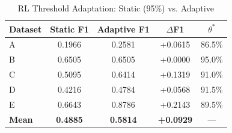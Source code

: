\begin{table}[htbp]
\caption{RL Threshold Adaptation: Static (95\%) vs. Adaptive}
\begin{center}
\begin{tabular}{|l|c|c|c|c|}
\hline
\textbf{Dataset} & \textbf{Static F1} & \textbf{Adaptive F1} & \textbf{$\Delta$F1} & \textbf{$\theta^*$} \\
\hline
A & 0.1966 & 0.2581 & +0.0615 & 86.5\% \\
B & 0.6505 & 0.6505 & +0.0000 & 95.0\% \\
C & 0.5095 & 0.6414 & +0.1319 & 91.0\% \\
D & 0.4216 & 0.4784 & +0.0568 & 91.5\% \\
E & 0.6643 & 0.8786 & +0.2143 & 89.5\% \\
\hline
\textbf{Mean} & \textbf{0.4885} & \textbf{0.5814} & \textbf{+0.0929} & --- \\
\hline
\end{tabular}
\label{tab:rl_threshold}
\end{center}
\end{table}